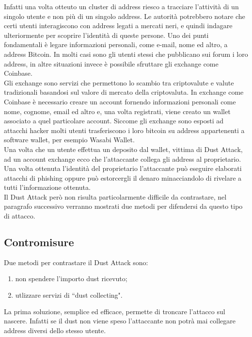 Infatti una volta otteuto un cluster di address riesco a tracciare l'attività di un singolo utente e non più di un singolo address. Le autorità potrebbero notare che certi utenti interagiscono con address legati a mercati neri, e quindi indagare ulteriormente per scoprire l'identità di queste persone. Uno dei punti fondamentali è legare informazioni personali, come e-mail, nome ed altro, a address Bitcoin. In molti casi sono gli utenti stessi che pubblicano sui forum i loro address, in altre situazioni invece è possibile sfruttare gli exchange come Coinbase.\\

Gli exchange sono servizi che permettono lo scambio tra criptovalute e valute tradizionali basandosi sul valore di mercato della criptovaluta. In exchange come Coinbase è necessario creare un account fornendo informazioni personali come nome, cognome, email ed altro e, una volta registrati, viene creato un wallet associato a quel particolare account. Siccome gli exchange sono esposti ad attacchi hacker molti utenti trasferiscono i loro bitcoin su address appartenenti a software wallet, per esempio Wasabi Wallet.\\

Una volta che un utente effettua un deposito dal wallet, vittima di Dust Attack, ad un account exchange ecco che l'attaccante collega gli address al proprietario. Una volta ottenuta l'identità del proprietario l'attaccante può eseguire elaborati attacchi di phishing oppure può estorcergli il denaro minacciandolo di rivelare a tutti l'informazione ottenuta.\\ 

Il Dust Attack però non risulta particolarmente difficile da contrastare, nel paragrafo successivo verranno mostrati due metodi per difendersi da questo tipo di attacco.
\subsection{Contromisure}
Due metodi per contrastare il Dust Attack sono:
    \begin{enumerate}
        \item non spendere l'importo dust ricevuto; 
        \item utlizzare servizi di ``dust collecting". 
    \end{enumerate}
    
La prima soluzione, semplice ed efficace, permette di troncare l'attacco sul nascere. Infatti se il dust non viene speso l'attaccante non potrà mai collegare address diversi dello stesso utente. 

